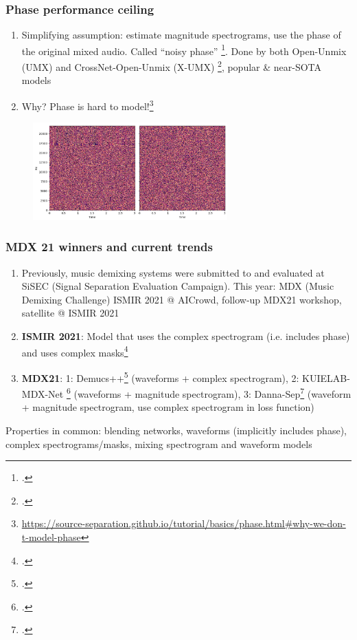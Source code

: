 \documentclass[usenames,dvipsnames]{beamer}
\begin{document}
\begin{frame}
	\frametitle{Phase performance ceiling}
	\begin{enumerate}
		\item
			Simplifying assumption: estimate magnitude spectrograms, use the phase of the original mixed audio. Called ``noisy phase'' \footcite{noisyphase1}. Done by both Open-Unmix (UMX) and CrossNet-Open-Unmix (X-UMX) \footcite{umx, xumx}, popular \& near-SOTA models
		\item
			Why? Phase is hard to model!\footnote{\url{https://source-separation.github.io/tutorial/basics/phase.html\#why-we-don-t-model-phase}}
	\end{enumerate}
	\begin{figure}[ht]
		\centering
		\includegraphics[width=7.5cm]{./images-mss/whynophase.png}
	\end{figure}
\end{frame}

\begin{frame}
	\frametitle{MDX 21 winners and current trends}
	\begin{enumerate}
		\item
			Previously, music demixing systems were submitted to and evaluated at SiSEC (Signal Separation Evaluation Campaign). This year: MDX (Music Demixing Challenge) ISMIR 2021 @ AICrowd, follow-up MDX21 workshop, satellite @ ISMIR 2021
		\item
			\textbf{ISMIR 2021}: Model that uses the complex spectrogram (i.e. includes phase) and uses complex masks\footcite{kong2021decoupling}
		\item
			\textbf{MDX21}: 1: Demucs++\footcite{demucsplus} (waveforms + complex spectrogram), 2: KUIELAB-MDX-Net \footcite{choi2021} (waveforms + magnitude spectrogram), 3: Danna-Sep\footcite{dannasep} (waveform + magnitude spectrogram, use complex spectrogram in loss function)
	\end{enumerate}
	Properties in common: blending networks, waveforms (implicitly includes phase), complex spectrograms/masks, mixing spectrogram and waveform models
\end{frame}
\end{document}
